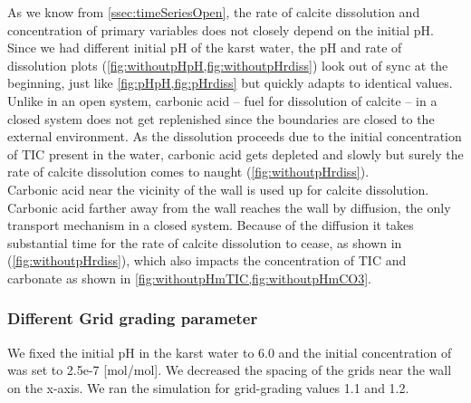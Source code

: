 As we know from \ref{ssec:timeSeriesOpen}, the rate of calcite dissolution and concentration of primary variables 
does not closely depend on the initial pH. Since we had different initial pH of the karst water, the pH and rate of 
dissolution plots (\cref{fig:withoutpHpH,fig:withoutpHrdiss}) look out of sync at the beginning, just 
like \cref{fig:pHpH,fig:pHrdiss} but quickly adapts to identical values. 
Unlike in an open system, carbonic acid -- fuel for dissolution of calcite -- in a closed system does not get replenished since 
the boundaries are closed to the external environment. As the dissolution proceeds due to the initial concentration 
of TIC present in the water, carbonic acid gets depleted and slowly but surely the rate of calcite dissolution comes to naught (\cref{fig:withoutpHrdiss}). \\

Carbonic acid near the vicinity of the wall is used up for calcite dissolution. Carbonic acid farther away from the wall reaches the wall by 
diffusion, the only transport mechanism in a closed system. Because of the diffusion it takes substantial time for 
the rate of calcite dissolution to cease, as shown in (\cref{fig:withoutpHrdiss}), which also impacts the concentration of TIC and carbonate as shown in 
\cref{fig:withoutpHmTIC,fig:withoutpHmCO3}.


\subsubsection*{Different Grid grading parameter} \label{ssec:diffGridnoflow}
We fixed the initial pH in the karst water to 6.0 and the initial concentration of   was set to 2.5e-7 [mol/mol]. We decreased the 
spacing of the grids near the wall on the x-axis. We ran the simulation for grid-grading values 1.1 and 1.2. 


